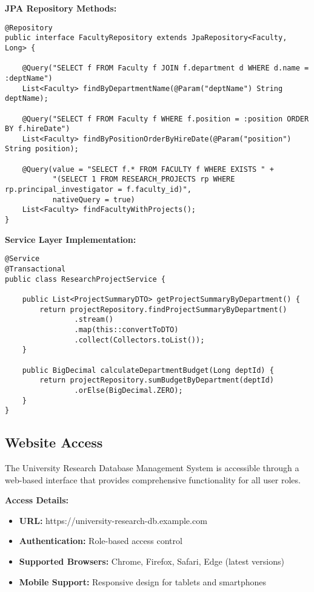 \documentclass[12pt,a4paper]{article}
\begin{document}
\textbf{JPA Repository Methods:}
\begin{lstlisting}[style=sqlstyle]
@Repository
public interface FacultyRepository extends JpaRepository<Faculty, Long> {
    
    @Query("SELECT f FROM Faculty f JOIN f.department d WHERE d.name = :deptName")
    List<Faculty> findByDepartmentName(@Param("deptName") String deptName);
    
    @Query("SELECT f FROM Faculty f WHERE f.position = :position ORDER BY f.hireDate")
    List<Faculty> findByPositionOrderByHireDate(@Param("position") String position);
    
    @Query(value = "SELECT f.* FROM FACULTY f WHERE EXISTS " +
           "(SELECT 1 FROM RESEARCH_PROJECTS rp WHERE rp.principal_investigator = f.faculty_id)",
           nativeQuery = true)
    List<Faculty> findFacultyWithProjects();
}
\end{lstlisting}

\textbf{Service Layer Implementation:}
\begin{lstlisting}[style=sqlstyle]
@Service
@Transactional
public class ResearchProjectService {
    
    public List<ProjectSummaryDTO> getProjectSummaryByDepartment() {
        return projectRepository.findProjectSummaryByDepartment()
                .stream()
                .map(this::convertToDTO)
                .collect(Collectors.toList());
    }
    
    public BigDecimal calculateDepartmentBudget(Long deptId) {
        return projectRepository.sumBudgetByDepartment(deptId)
                .orElse(BigDecimal.ZERO);
    }
}
\end{lstlisting}

\subsection{Website Access}
The University Research Database Management System is accessible through a web-based interface that provides comprehensive functionality for all user roles.

\textbf{Access Details:}
\begin{itemize}
    \item \textbf{URL:} https://university-research-db.example.com
    \item \textbf{Authentication:} Role-based access control
    \item \textbf{Supported Browsers:} Chrome, Firefox, Safari, Edge (latest versions)
    \item \textbf{Mobile Support:} Responsive design for tablets and smartphones
\end{itemize}
\end{document}
